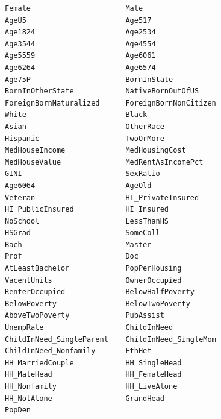 \documentclass[compsoc]{IEEEtran}
\begin{document}

\footnotesize{\begin{lstlisting}
Female                      Male                      
AgeU5                       Age517                    
Age1824                     Age2534                   
Age3544                     Age4554                   
Age5559                     Age6061                   
Age6264                     Age6574                   
Age75P                      BornInState               
BornInOtherState            NativeBornOutOfUS         
ForeignBornNaturalized      ForeignBornNonCitizen     
White                       Black                     
Asian                       OtherRace                 
Hispanic                    TwoOrMore                 
MedHouseIncome              MedHousingCost            
MedHouseValue               MedRentAsIncomePct        
GINI                        SexRatio                  
Age6064                     AgeOld                    
Veteran                     HI_PrivateInsured         
HI_PublicInsured            HI_Insured                
NoSchool                    LessThanHS                
HSGrad                      SomeColl                  
Bach                        Master                    
Prof                        Doc                       
AtLeastBachelor             PopPerHousing             
VacentUnits                 OwnerOccupied             
RenterOccupied              BelowHalfPoverty          
BelowPoverty                BelowTwoPoverty           
AboveTwoPoverty             PubAssist                 
UnempRate                   ChildInNeed               
ChildInNeed_SingleParent    ChildInNeed_SingleMom     
ChildInNeed_Nonfamily       EthHet                    
HH_MarriedCouple            HH_SingleHead             
HH_MaleHead                 HH_FemaleHead             
HH_Nonfamily                HH_LiveAlone              
HH_NotAlone                 GrandHead                 
PopDen                                
\end{lstlisting}}
\end{document}
